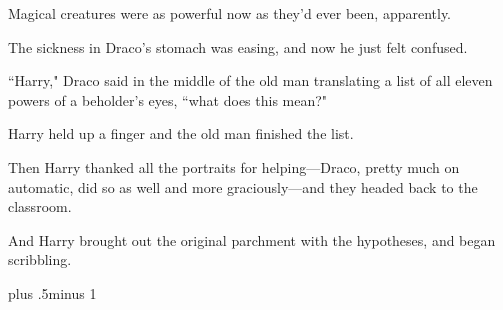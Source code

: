 Magical creatures were as powerful now as they'd ever been, apparently.

The sickness in Draco's stomach was easing, and now he just felt confused.

``Harry," Draco said in the middle of the old man translating a list of all eleven powers of a beholder's eyes, ``what does this mean?"

Harry held up a finger and the old man finished the list.

Then Harry thanked all the portraits for helping—Draco, pretty much on automatic, did so as well and more graciously—and they headed back to the classroom.

And Harry brought out the original parchment with the hypotheses, and began scribbling.

\baselineskip plus .5\textheight minus 1\baselineskip

\savetrivseps
\setlength{\topsep}{0pt}
\setlength{\partopsep}{0pt}

